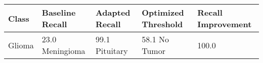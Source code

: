 \begin{tabular}{lllll}
\toprule
Class & Baseline Recall & Adapted Recall & Optimized Threshold & Recall Improvement \\
\midrule
Glioma & 23.0%
Meningioma & 99.1%
Pituitary & 58.1%
No Tumor & 100.0%
\bottomrule
\end{tabular}


